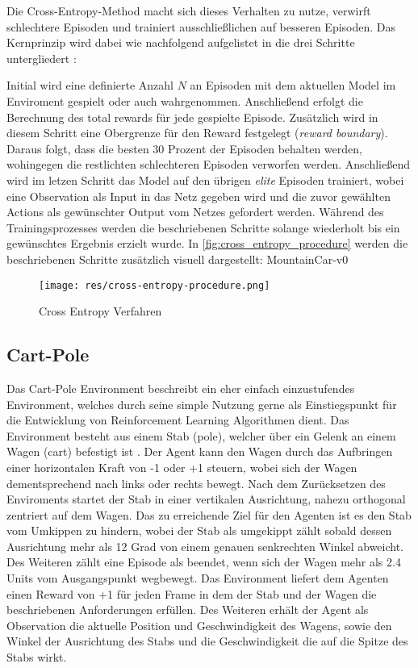 \documentclass[11pt]{scrartcl}
\begin{document}
Die Cross-Entropy-Method macht sich dieses Verhalten zu nutze, verwirft schlechtere Episoden und
trainiert ausschließlichen auf besseren Episoden. Das Kernprinzip wird dabei wie nachfolgend
aufgelistet in die drei Schritte untergliedert \cite[~S.80 f.]{L2018}:

Initial wird eine definierte Anzahl $N$ an Episoden mit dem aktuellen Model im Enviroment gespielt
oder auch wahrgenommen. Anschließend erfolgt die Berechnung des total rewards für jede gespielte
Episode. Zusätzlich wird in diesem Schritt eine Obergrenze für den Reward festgelegt 
(\textit{reward boundary}). Daraus folgt, dass die besten 30 Prozent der Episoden behalten werden,
wohingegen die restlichten schlechteren Episoden verworfen werden. Anschließend wird im letzen Schritt
das Model auf den übrigen \textit{elite} Episoden trainiert, wobei eine Observation als Input in das
Netz gegeben wird und die zuvor gewählten Actions als gewünschter Output vom Netzes gefordert werden.
Während des Trainingsprozesses werden die beschriebenen Schritte solange wiederholt bis ein gewünschtes
Ergebnis erzielt wurde. In \autoref{fig:cross_entropy_procedure} werden die beschriebenen Schritte
zusätzlich visuell dargestellt: MountainCar-v0

\begin{figure}[htp]
\centering
\texttt{[image: res/cross-entropy-procedure.png]}
\caption{Cross Entropy Verfahren}
\label{fig:cross_entropy_procedure}
\end{figure}

\subsection{Cart-Pole}
Das Cart-Pole Environment beschreibt ein eher einfach einzustufendes Environment, welches durch seine
simple Nutzung gerne als Einstiegspunkt für die Entwicklung von Reinforcement Learning Algorithmen 
dient. Das Environment besteht aus einem Stab (pole), welcher über ein Gelenk an einem Wagen (cart) 
befestigt ist \cite{OAI2016_2}. Der Agent kann den Wagen durch das Aufbringen einer horizontalen Kraft 
von -1 oder +1 steuern, wobei sich der Wagen dementsprechend nach links oder rechts bewegt. Nach 
dem Zurücksetzen des Enviroments startet der Stab in einer vertikalen Ausrichtung, nahezu orthogonal
zentriert auf dem Wagen. Das zu erreichende Ziel für den Agenten ist es den Stab vom Umkippen zu hindern,
wobei der Stab als umgekippt zählt sobald dessen Ausrichtung mehr als 12 Grad von einem genauen
senkrechten Winkel abweicht. Des Weiteren zählt eine Episode als beendet, wenn sich der Wagen mehr
als 2.4 Units vom Ausgangspunkt wegbewegt. Das Environment liefert dem Agenten einen Reward von +1
für jeden Frame in dem der Stab und der Wagen die beschriebenen Anforderungen erfüllen. Des Weiteren
erhält der Agent als Observation die aktuelle Position und Geschwindigkeit des Wagens, sowie den Winkel
der Ausrichtung des Stabs und die Geschwindigkeit die auf die Spitze des Stabs wirkt.
\end{document}
